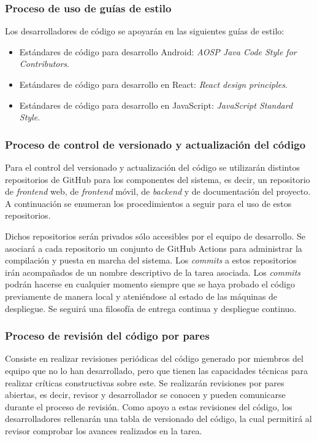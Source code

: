 \documentclass{article}
\begin{document}
\subsubsection{Proceso de uso de guías de estilo} \label{P.EC.10}

Los desarrolladores de código se apoyarán en las siguientes guías de estilo:

\begin{itemize}
   \setlength{\itemsep}{0em}
   \item Estándares de código para desarrollo Android: \textit{AOSP Java Code Style for Contributors}.
   \item Estándares de código para desarrollo en React: \textit{React design principles}.
   \item Estándares de código para desarrollo en JavaScript: \textit{JavaScript Standard Style}.
\end{itemize}

\subsubsection{Proceso de control de versionado y actualización del código} \label{P.EC.11}

Para el control del versionado y actualización del código se utilizarán distintos repositorios de GitHub para los componentes del sistema, es decir, un repositorio de \textit{frontend} web, de \textit{frontend} móvil, de \textit{backend} y de documentación del proyecto. A continuación se enumeran los procedimientos a seguir para el uso de estos repositorios.

Dichos repositorios serán privados sólo accesibles por el equipo de desarrollo. 
Se asociará a cada repositorio un conjunto de GitHub Actions para administrar la compilación y puesta en marcha del sistema. 
Los \textit{commits} a estos repositorios irán acompañados de un nombre descriptivo de la tarea asociada. 
Los \textit{commits} podrán hacerse en cualquier momento siempre que se haya probado el código previamente de manera local y ateniéndose al estado de las máquinas de despliegue. 
Se seguirá una filosofía de entrega continua y despliegue continuo.

\subsubsection{Proceso de revisión del código por pares} \label{P.EC.12}

Consiste en realizar revisiones periódicas del código generado por miembros del equipo que no lo han desarrollado, pero que tienen las capacidades técnicas para realizar críticas constructivas sobre este. Se realizarán revisiones por pares abiertas, es decir, revisor y desarrollador se conocen y pueden comunicarse durante el proceso de revisión. Como apoyo a estas revisiones del código, los desarrolladores rellenarán una tabla de versionado del código, la cual permitirá al revisor comprobar los avances realizados en la tarea.
\end{document}
